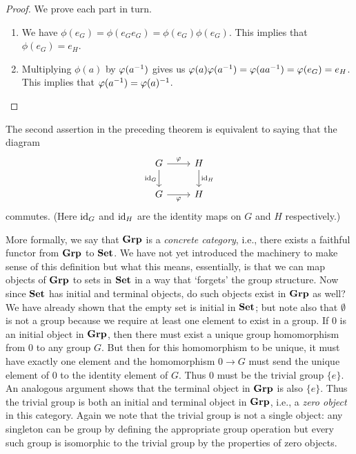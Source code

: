 \begin{proof}
    We prove each part in turn.

    \begin{enumerate}[label=(\alph*), wide]
        \item We have \(\phi(e_G) = \phi(e_G e_G) = \phi(e_G) \phi(e_G)\). This
        implies that \(\phi(e_G) = e_H\).
        \item Multiplying \(\phi(a)\) by \(\varphi(a^{-1})\) gives us
        \(\varphi(a)\varphi(a^{-1}) = \varphi(aa^{-1}) = \varphi(e_G) = e_H\). This implies
        that \(\varphi(a^{-1}) = \varphi(a)^{-1}\).
    \end{enumerate}
\end{proof}

The second assertion in the preceding theorem is equivalent to saying that the
diagram
\[
    \begin{tikzcd}
        G \arrow{r}{\phi} \arrow[swap]{d}{\id_G} & H \arrow{d}{\id_H} \\
        G \arrow[swap]{r}{\phi} & H
    \end{tikzcd}
\]
commutes. (Here \(\operatorname{id}_G\) and \(\operatorname{id}_H\) are the identity maps on \(G\) and \(H\)
respectively.)

More formally, we say that \(\mathbf{Grp}\) is a \emph{concrete category}, i.e., there
exists a faithful functor from \(\mathbf{Grp}\) to \(\mathbf{Set}\). We have not yet introduced
the machinery to make sense of this definition but what this means, essentially,
is that we can map objects of \(\mathbf{Grp}\) to sets in \(\mathbf{Set}\) in a way that
`forgets' the group structure. Now since \(\mathbf{Set}\) has initial and terminal
objects, do such objects exist in \(\mathbf{Grp}\) as well? We have already shown that
the empty set is initial in \(\mathbf{Set}\); but note also that \(\emptyset\) is not a
group because we require at least one element to exist in a group. If \(0\) is
an initial object in \(\mathbf{Grp}\), then there must exist a unique group homomorphism
from \(0\) to any group \(G\). But then for this homomorphism to be unique, it
must have exactly one element and the homomorphism \(0 \to G\) must send the
unique element of \(0\) to the identity element of \(G\). Thus \(0\) must be the
trivial group \(\{e\}\). An analogous argument shows that the terminal object in
\(\mathbf{Grp}\) is also \(\{e\}\). Thus the trivial group is both an initial and
terminal object in \(\mathbf{Grp}\), i.e., a \emph{zero object} in this category. Again
we note that the trivial group is not a single object: any singleton can be
group by defining the appropriate group operation but every such group is
isomorphic to the trivial group by the properties of zero objects.

